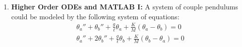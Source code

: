 \documentclass[letterpaper, fontsize=12pt]{scrartcl} %
\numberwithin{equation}{section} %
\numberwithin{figure}{section} %
\numberwithin{table}{section} %
\begin{document}
\begin{enumerate}
%

\item \textbf{Higher Order ODEs and MATLAB I:}
A system of couple pendulums could be modeled by the following system of equations: 
\begin{gather*}
\theta_a'' + \theta_b'' + \frac{g}{\ell}\theta_a + \frac{K}{M}(\theta_a - \theta_b) = 0 \tag{1}\\
\theta_a'' + 2 \theta_b'' + \frac{g}{\ell}\theta_b + \frac{K}{M}(\theta_b - \theta_a) = 0 \tag{2}
\end{gather*}



\end{enumerate}
\end{document}

